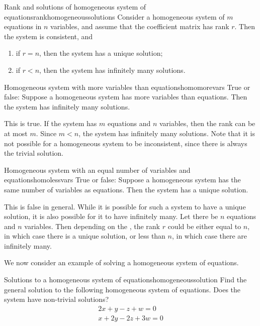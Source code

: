 \begin{theorem}{Rank and solutions of homogeneous system of equations}{rankhomogeneoussolutions}
  Consider a homogeneous system of $m$ equations in $n$ variables, and
  assume that the coefficient matrix has rank $r$. Then the system is
  consistent, and 
\begin{enumerate}
\item if $r=n$, then the system has a unique solution;
\item if $r<n$, then the system has infinitely many solutions.
\end{enumerate}
\end{theorem}

\begin{example}{Homogeneous system with more variables than equations}{homomorevars}
  True or false: Suppose a homogeneous system has more variables than
  equations. Then the system has infinitely many solutions.  
\end{example}

\begin{solution}
  This is true. If the system has $m$ equations and $n$ variables,
  then the rank can be at most $m$. Since $m<n$, the system has
  infinitely many solutions. Note that it is not possible for a
  homogeneous system to be inconsistent, since there is always the
  trivial solution.
\end{solution} 

\begin{example}{Homogeneous system with an equal number of variables and equations}{homolessvars}
  True or false: Suppose a homogeneous system has the same number of
  variables as equations. Then the system has a unique solution.
\end{example}

\begin{solution}
  This is false in general. While it is possible for such a system to
  have a unique solution, it is also possible for it to have
  infinitely many. Let there be $n$ equations and $n$ variables.  Then
  depending on the {\ef}, the rank $r$ could be either equal to $n$,
  in which case there is a unique solution, or less than $n$, in which
  case there are infinitely many.
\end{solution}

We now consider an example of solving a homogeneous system of equations.

\begin{example}{Solutions to a homogeneous system of equations}{homogeneoussolution}
Find the general solution to the following homogeneous system of
equations. Does the system have non-trivial solutions?
\begin{equation*}
\begin{array}{c}
2x + y - z + w = 0 \\
x + 2y - 2z + 3w = 0
\end{array}
\end{equation*}
\end{example}

